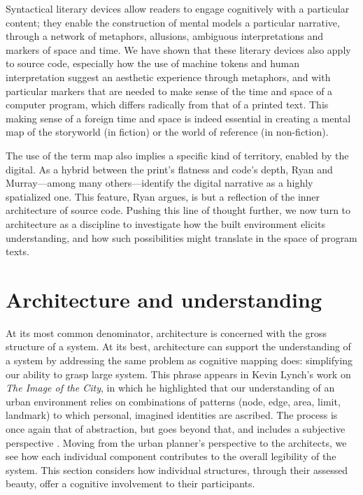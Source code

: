 \spacer

Syntactical literary devices allow readers to engage cognitively with a particular content; they enable the construction of mental models a particular narrative, through a network of metaphors, allusions, ambiguous interpretations and markers of space and time. We have shown that these literary devices also apply to source code, especially how the use of machine tokens and human interpretation suggest an aesthetic experience through metaphors, and with particular markers that are needed to make sense of the time and space of a computer program, which differs radically from that of a printed text. This making sense of a foreign time and space is indeed essential in creating a mental map of the storyworld (in fiction) or the world of reference (in non-fiction).

The use of the term map also implies a specific kind of territory, enabled by the digital. As a hybrid between the print's flatness and code's depth, Ryan and Murray—among many others—identify the digital narrative as a highly spatialized one. This feature, Ryan argues, is but a reflection of the inner architecture of source code. Pushing this line of thought further, we now turn to architecture as a discipline to investigate how the built environment elicits understanding, and how such possibilities might translate in the space of program texts.

\section{Architecture and understanding}
\label{sec:arch-understanding}

At its most common denominator, architecture is concerned with the gross structure of a system. At its best, architecture can support the understanding of a system by addressing the same problem as cognitive mapping does: simplifying our ability to grasp large system. This phrase appears in Kevin Lynch's work on \emph{The Image of the City}, in which he highlighted that our understanding of an urban environment relies on combinations of patterns (node, edge, area, limit, landmark) to which personal, imagined identities are ascribed. The process is once again that of abstraction, but goes beyond that, and includes a subjective perspective \citep{lynch_image_1959}. Moving from the urban planner's perspective to the architects, we see how each individual component contributes to the overall legibility of the system. This section considers how individual structures, through their assessed beauty, offer a cognitive involvement to their participants.

